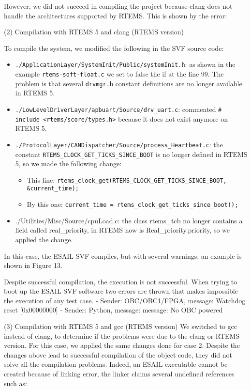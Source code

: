 However, we did not succeed in compiling the project because clang does not handle the architectures supported by RTEMS. This is shown by the error:

(2) Compilation with RTEMS 5 and clang (RTEMS version)

To compile the system, we modified the following in the SVF source code:

\begin{itemize}
	\item \texttt{./ApplicationLayer/SystemInit/Public/systemInit.h}: as shown in the example \texttt{rtems-soft-float.c} we set to false the if at the line 99. The problem is that several \texttt{drvmgr.h} constant definitions are no longer available in RTEMS 5.
	\item \texttt{./LowLevelDriverLayer/apbuart/Source/drv\_uart.c}: commented \texttt{\# include \textless rtems/score/types.h\textgreater } because it does not exist anymore on RTEMS 5.
	\item \texttt{./ProtocolLayer/CANDispatcher/Source/process\_Heartbeat.c}: the constant \texttt{RTEMS\_CLOCK\_GET\_TICKS\_SINCE\_BOOT} is no longer defined in RTEMS 5, so we made the following change:
	\begin{itemize}
		\item  This line:   \texttt{rtems\_clock\_get(RTEMS\_CLOCK\_GET\_TICKS\_SINCE\_BOOT, \&current\_time);}
		\item  By this one: \texttt{current\_time = rtems\_clock\_get\_ticks\_since\_boot();}
	\end{itemize}
	\item ./Utilities/Misc/Source/cpuLoad.c: the class rtems\_tcb no longer contains a field called real\_priority, in RTEMS now is Real\_priority.priority, so we applied the change.
\end{itemize}

In this case, the ESAIL SVF compiles, but with several warnings, an example is shown in Figure 13.

Despite successful compilation, the execution is not successful. When trying to boot up the ESAIL SVF software two errors are thrown that makes impossible the execution of any test case.
- Sender: OBC/OBC1/FPGA, message: Watchdog reset [0x00000000]
- Sender: Python, message: message: No OBC powered

(3) Compilation with RTEMS 5 and gcc (RTEMS version)
We switched to gcc instead of clang, to determine if the problems were due to the clang or RTEMS version. For this case, we applied the same changes done for case 2.
Despite the changes above lead to successful compilation of the object code, they did not solve all the compilation problems. Indeed, an ESAIL executable cannot be created because of linking error, the linker claims several undefined references such as:

